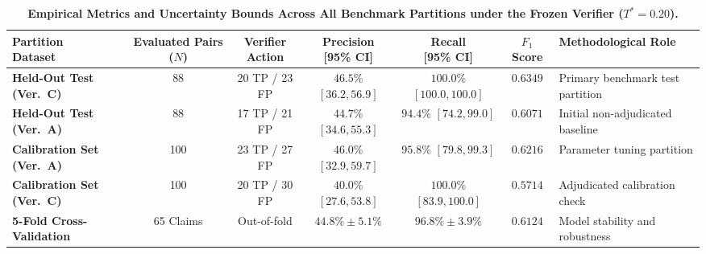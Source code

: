 \documentclass[11pt,a4paper]{article}
\begin{document}
\begin{table}[htbp]
\centering
\small
\caption{\textbf{Empirical Metrics and Uncertainty Bounds Across All Benchmark Partitions under the Frozen Verifier ($T^* = 0.20$).}}
\label{tab:cross_partition_metrics}
\begin{adjustbox}{max width=\textwidth}
\begin{tabular}{l c c c c c p{4.2cm}}
\toprule
\makecell{\textbf{Partition}\\\textbf{Dataset}} & \makecell{\textbf{Evaluated}\\\textbf{Pairs ($N$)}} & \makecell{\textbf{Verifier}\\\textbf{Action}} & \makecell{\textbf{Precision}\\\textbf{[95\% CI]}} & \makecell{\textbf{Recall}\\\textbf{[95\% CI]}} & \makecell{\textbf{$F_1$}\\\textbf{Score}} & \textbf{Methodological Role} \\
\midrule
\textbf{Held-Out Test (Ver.~C)} & 88 & 20 TP / 23 FP & $46.5\%$ $[36.2, 56.9]$ & $100.0\%$ $[100.0, 100.0]$ & $0.6349$ & Primary benchmark test partition \\
\textbf{Held-Out Test (Ver.~A)} & 88 & 17 TP / 21 FP & $44.7\%$ $[34.6, 55.3]$ & $94.4\%$ $[74.2, 99.0]$ & $0.6071$ & Initial non-adjudicated baseline \\
\textbf{Calibration Set (Ver.~A)} & 100 & 23 TP / 27 FP & $46.0\%$ $[32.9, 59.7]$ & $95.8\%$ $[79.8, 99.3]$ & $0.6216$ & Parameter tuning partition \\
\textbf{Calibration Set (Ver.~C)} & 100 & 20 TP / 30 FP & $40.0\%$ $[27.6, 53.8]$ & $100.0\%$ $[83.9, 100.0]$ & $0.5714$ & Adjudicated calibration check \\
\textbf{5-Fold Cross-Validation} & 65 Claims & Out-of-fold & $44.8\% \pm 5.1\%$ & $96.8\% \pm 3.9\%$ & $0.6124$ & Model stability and robustness \\
\bottomrule
\end{tabular}
\end{adjustbox}
\end{table}
\end{document}
